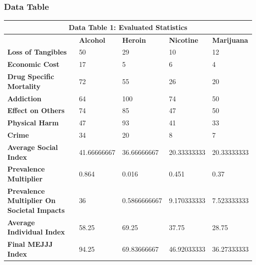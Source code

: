\documentclass{article}
\begin{document}
\subsubsection{Data Table}
{\center
\begin{tabular}{|l|l|l|l|l|}
\hline
\multicolumn{5}{|c|}{\textbf{Data Table 1: Evaluated Statistics}}                                                                 \\ \hline
                                                   & \textbf{Alcohol} & \textbf{Heroin} & \textbf{Nicotine} & \textbf{Marijuana} \\ \hline
\textbf{Loss of Tangibles}                         & 50               & 29               & 10                & 12                 \\ \cline{1-1}
\textbf{Economic Cost}                             & 17               & 5                & 6                 & 4                  \\ \cline{1-1}
\textbf{Drug Specific Mortality}                   & 72               & 55               & 26                & 20                 \\ \cline{1-1}
\textbf{Addiction}                                 & 64               & 100              & 74                & 50                 \\ \cline{1-1}
\textbf{Effect on Others}                          & 74               & 85               & 47                & 50                 \\ \cline{1-1}
\textbf{Physical Harm}                             & 47               & 93               & 41                & 33                 \\ \cline{1-1}
\textbf{Crime}                        & 34               & 20               & 8                 & 7                  \\ \cline{1-1}
\textbf{Average Social Index}                      & 41.66666667      & 36.66666667      & 20.33333333       & 20.33333333        \\ \cline{1-1}
\textbf{Prevalence Multiplier}                     & 0.864            & 0.016            & 0.451             & 0.37               \\ \cline{1-1}
\textbf{Prevalence Multiplier On Societal Impacts} & 36               & 0.5866666667     & 9.170333333       & 7.523333333        \\ \cline{1-1}
\textbf{Average Individual Index}                  & 58.25            & 69.25            & 37.75             & 28.75              \\ \hline
\textbf{Final MEJJJ Index}                               & 94.25            & 69.83666667      & 46.92033333       & 36.27333333        \\ \hline
\end{tabular}
\par}
\end{document}
